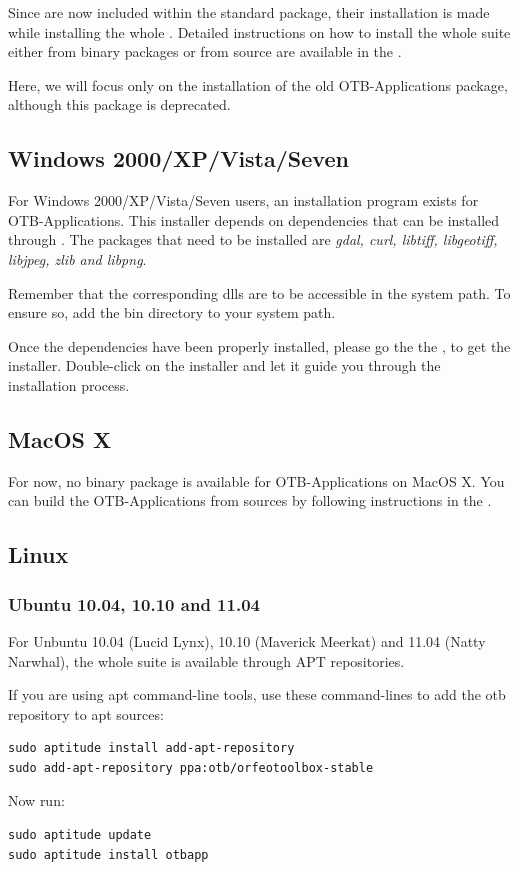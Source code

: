 Since \app are now included within the standard \otb package, their 
installation is made while installing the whole \otb. Detailed 
instructions on how to install the whole \otb suite either from 
binary packages or from source are available in the \sg. 

Here, we will focus only on the installation of the old OTB-Applications 
package, although this package is deprecated.

\subsection{Windows 2000/XP/Vista/Seven}
\label{ssec:app_windows_binaries}

For Windows 2000/XP/Vista/Seven users, an installation program exists
for OTB-Applications. This installer depends on dependencies that can
be installed through \osgeow. The packages that need to be installed
are \emph{gdal, curl, libtiff, libgeotiff, libjpeg, zlib and libpng}.

Remember that the corresponding dlls are to be accessible in the
system path. To ensure so, add the \osgeow bin directory to your
system path.

 Once the dependencies have been properly installed, please go the the
 \download, to get the installer. Double-click on the installer and
 let it guide you through the installation process.

\subsection{MacOS X}
\label{ssec:mac_binaries}

For now, no binary package is available for OTB-Applications on 
MacOS X. You can build the OTB-Applications from sources by 
following instructions in the \sg.

\subsection{Linux}

\subsubsection{Ubuntu 10.04, 10.10 and 11.04}
\label{ssec:ubuntu_binaries}
For Unbuntu 10.04 (Lucid Lynx), 10.10 (Maverick Meerkat) and 11.04
(Natty Narwhal), the whole \otb suite is available through APT repositories.

If you are using apt command-line tools, use these command-lines to
add the otb repository to apt sources:
\begin{verbatim}
sudo aptitude install add-apt-repository 
sudo add-apt-repository ppa:otb/orfeotoolbox-stable
\end{verbatim}
Now run:
\begin{verbatim}
sudo aptitude update
sudo aptitude install otbapp
\end{verbatim}

